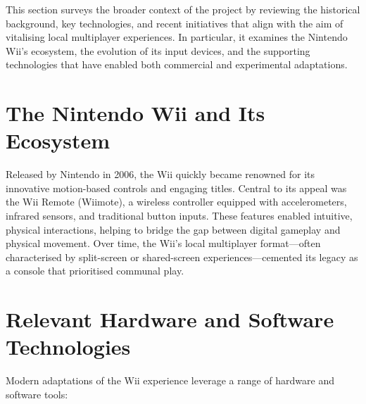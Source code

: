 \label{chapter:context}

This section surveys the broader context of the project by reviewing the historical background, key technologies, and recent initiatives that align with the aim of vitalising local multiplayer experiences. In particular, it examines the Nintendo Wii’s ecosystem, the evolution of its input devices, and the supporting technologies that have enabled both commercial and experimental adaptations.

\section{The Nintendo Wii and Its Ecosystem}
Released by Nintendo in 2006, the Wii quickly became renowned for its innovative motion-based controls and engaging titles. Central to its appeal was the Wii Remote (Wiimote), a wireless controller equipped with accelerometers, infrared sensors, and traditional button inputs. These features enabled intuitive, physical interactions, helping to bridge the gap between digital gameplay and physical movement. Over time, the Wii’s local multiplayer format—often characterised by split-screen or shared-screen experiences—cemented its legacy as a console that prioritised communal play.

\section{Relevant Hardware and Software Technologies}
Modern adaptations of the Wii experience leverage a range of hardware and software tools:

